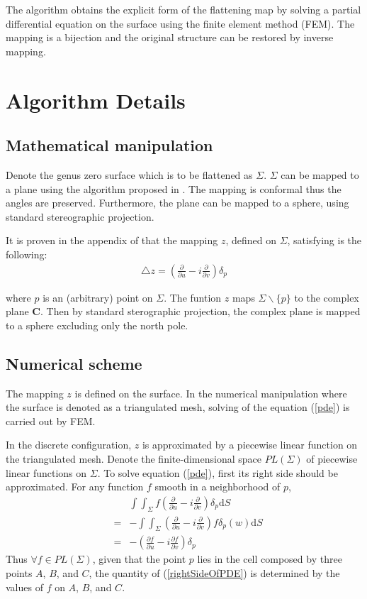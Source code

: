 \documentclass{InsightArticle}
\begin{document}
	The algorithm obtains the explicit form of the flattening map by
	solving a partial differential equation on the surface using the
	finite element method (FEM). The mapping is a bijection and the
	original structure can be restored by inverse mapping.

	\section{Algorithm Details}

	\subsection{Mathematical manipulation}
  Denote the genus zero surface which is to be flattened as $\Sigma$.
  $\Sigma$ can be mapped to a plane using the algorithm proposed in
  \cite{angenent1999lbo}. The mapping is conformal thus the angles are
  preserved. Furthermore, the plane can be mapped to a sphere, using
  standard stereographic projection.
  
  It is proven in the appendix of \cite{angenent1999lbo} that the mapping
  $z$, defined on $\Sigma$, satisfying is the following:
  \begin{eqnarray}
    \triangle z = (\frac{\partial}{\partial u} - i\frac{\partial}{\partial v})\delta_p 
    \label{pde}
  \end{eqnarray}
  
  where $p$ is an (arbitrary) point on $\Sigma$. The funtion $z$ maps
  $\Sigma \backslash \{p\}$ to the complex plane $\mathbf{C}$. Then by
  standard sterographic projection, the complex plane is mapped to a
  sphere excluding only the north pole.

  \subsection{Numerical scheme}
  The mapping $z$ is defined on the surface. In the numerical
  manipulation where the surface is denoted as a triangulated mesh,
  solving of the equation (\ref{pde}) is carried out by FEM.
  
  In the discrete configuration, $z$ is approximated by a piecewise
  linear function on the triangulated mesh. Denote the
  finite-dimensional space $PL(\Sigma)$ of piecewise linear functions
  on $\Sigma$. To solve equation (\ref{pde}), first its right side
  should be approximated. For any function $f$ smooth in a
  neighborhood of $p$,
  \begin{eqnarray}
    && \int\int_{\Sigma} f (\frac{\partial}{\partial u} - i\frac{\partial}{\partial v})\delta_p \mathrm{d}S \nonumber \\
    &=& - \int\int_{\Sigma}(\frac{\partial}{\partial u} - i\frac{\partial}{\partial v})f \delta_p(w) \mathrm{d}S \nonumber \\
    &=& -(\frac{\partial f}{\partial u} - i\frac{\partial f}{\partial v})\delta_p \label{rightSideOfPDE}
  \end{eqnarray}  
  Thus $\forall f \in PL(\Sigma)$, given that the point $p$ lies in
  the cell composed by three points $A$, $B$, and $C$, the quantity of
  (\ref{rightSideOfPDE}) is determined by the values of $f$ on $A$,
  $B$, and $C$.
  
\end{document}
